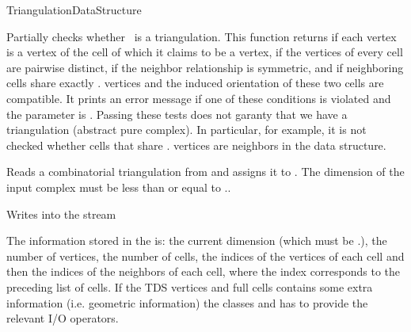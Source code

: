 \begin{ccRefConcept}{TriangulationDataStructure}
\begin{ccAdvanced}
\end{ccAdvanced}


{Partially checks whether \ccVar\ is a triangulation. This function
returns  if each vertex is a vertex of the cell of which it
claims to be a vertex, if the vertices of every cell are pairwise distinct,
if the neighbor relationship is symmetric, and if neighboring cells share
exactly \ccVar. vertices and the induced
orientation of these two cells are compatible.
 It prints an error message
if one of these conditions is violated and the  parameter is
. Passing these tests does not garanty that we have a
triangulation (abstract pure
complex). In particular, for example, it is not
checked whether cells that share \ccVar. vertices
are neighbors in the data structure.}


{Reads a combinatorial triangulation from  and assigns it to
. \ccPrecond The dimension of the input complex must be less than or
equal to \ccVar..}

{Writes  into the stream }

The information stored in the  is: the current dimension (which
must be \ccc{<=} \ccVar.), the number of vertices,
the number of cells, the indices of the vertices of each cell and then the
indices of the neighbors of each cell, where the index corresponds to the
preceding list of cells.
If the TDS vertices and full cells contains some extra information
(i.e. geometric information) the classes  and
 has to provide the relevant I/O operators.


\ccSeeAlso

\\

\end{ccRefConcept}
